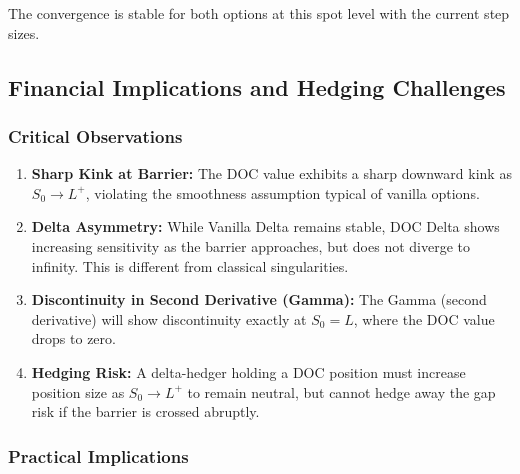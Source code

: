\documentclass{report}
\begin{document}
The convergence is stable for both options at this spot level with the current step sizes.

\subsection{Financial Implications and Hedging Challenges}

\subsubsection{Critical Observations}

\begin{enumerate}
    \item \textbf{Sharp Kink at Barrier:} The DOC value exhibits a sharp downward kink as $S_0 \to L^+$, violating the smoothness assumption typical of vanilla options.
    
    \item \textbf{Delta Asymmetry:} While Vanilla Delta remains stable, DOC Delta shows increasing sensitivity as the barrier approaches, but does not diverge to infinity. This is different from classical singularities.
    
    \item \textbf{Discontinuity in Second Derivative (Gamma):} The Gamma (second derivative) will show discontinuity exactly at $S_0 = L$, where the DOC value drops to zero.
    
    \item \textbf{Hedging Risk:} A delta-hedger holding a DOC position must increase position size as $S_0 \to L^+$ to remain neutral, but cannot hedge away the gap risk if the barrier is crossed abruptly.
\end{enumerate}

\subsubsection{Practical Implications}
\end{document}
